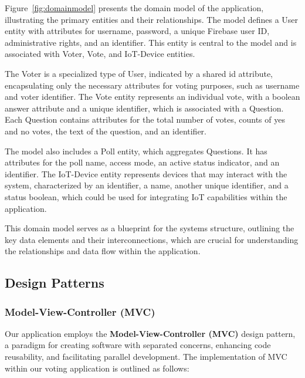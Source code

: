 Figure~\ref{fig:domainmodel} presents the domain model of the application, illustrating the primary entities and their relationships. The model defines a User entity with attributes for username, password, a unique Firebase user ID, administrative rights, and an identifier. This entity is central to the model and is associated with Voter, Vote, and IoT-Device entities.

The Voter is a specialized type of User, indicated by a shared id attribute, encapsulating only the necessary attributes for voting purposes, such as username and voter identifier. The Vote entity represents an individual vote, with a boolean answer attribute and a unique identifier, which is associated with a Question. Each Question contains attributes for the total number of votes, counts of yes and no votes, the text of the question, and an identifier.

The model also includes a Poll entity, which aggregates Questions. It has attributes for the poll name, access mode, an active status indicator, and an identifier. The IoT-Device entity represents devices that may interact with the system, characterized by an identifier, a name, another unique identifier, and a status boolean, which could be used for integrating IoT capabilities within the application.

This domain model serves as a blueprint for the systems structure, outlining the key data elements and their interconnections, which are crucial for understanding the relationships and data flow within the application.

\subsection{Design Patterns}

\subsubsection{Model-View-Controller (MVC)}

Our application employs the \textbf{Model-View-Controller (MVC)} design pattern, a paradigm for creating software with separated concerns, enhancing code reusability, and facilitating parallel development. The implementation of MVC within our voting application is outlined as follows:

